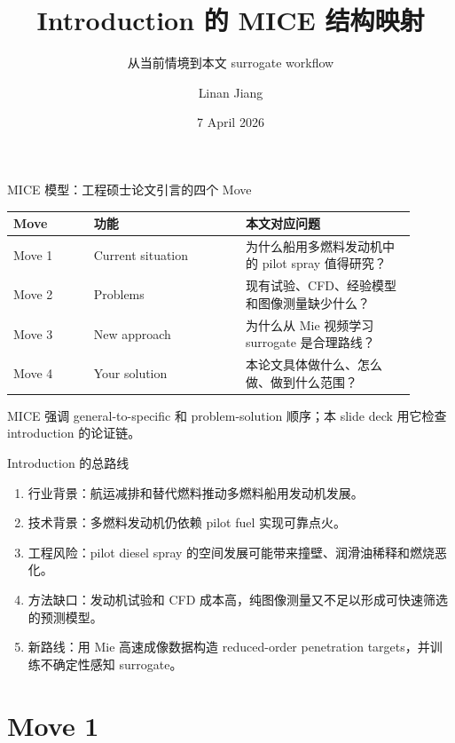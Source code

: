 \documentclass[aspectratio=169,11pt]{beamer}
\title[MICE Introduction Map]{Introduction 的 MICE 结构映射}
\subtitle{从当前情境到本文 surrogate workflow}
\author{Linan Jiang}
\institute{Aalto University}
\date{7 April 2026}
\newcommand{\claim}[1]{\textcolor{blue!65!black}{#1}}
\newcommand{\gaptext}[1]{\textcolor{red!65!black}{#1}}
\newcommand{\solutiontext}[1]{\textcolor{green!45!black}{#1}}
\begin{document}
\begin{frame}
  \titlepage
\end{frame}

\begin{frame}{MICE 模型：工程硕士论文引言的四个 Move}
\small
\begin{tabular}{L{0.18\linewidth}L{0.34\linewidth}L{0.38\linewidth}}
\toprule
Move & 功能 & 本文对应问题 \\
\midrule
Move 1 & Current situation & 为什么船用多燃料发动机中的 pilot spray 值得研究？ \\
Move 2 & Problems & 现有试验、CFD、经验模型和图像测量缺少什么？ \\
Move 3 & New approach & 为什么从 Mie 视频学习 surrogate 是合理路线？ \\
Move 4 & Your solution & 本论文具体做什么、怎么做、做到什么范围？ \\
\bottomrule
\end{tabular}

\vspace{0.7em}
\footnotesize
MICE 强调 general-to-specific 和 problem-solution 顺序；本 slide deck 用它检查 introduction 的论证链。
\end{frame}

\begin{frame}{Introduction 的总路线}
\small
\begin{enumerate}
  \item \claim{行业背景}：航运减排和替代燃料推动多燃料船用发动机发展。
  \item \claim{技术背景}：多燃料发动机仍依赖 pilot fuel 实现可靠点火。
  \item \gaptext{工程风险}：pilot diesel spray 的空间发展可能带来撞壁、润滑油稀释和燃烧恶化。
  \item \gaptext{方法缺口}：发动机试验和 CFD 成本高，纯图像测量又不足以形成可快速筛选的预测模型。
  \item \solutiontext{新路线}：用 Mie 高速成像数据构造 reduced-order penetration targets，并训练不确定性感知 surrogate。
\end{enumerate}
\end{frame}

\section{Move 1}
\end{document}

